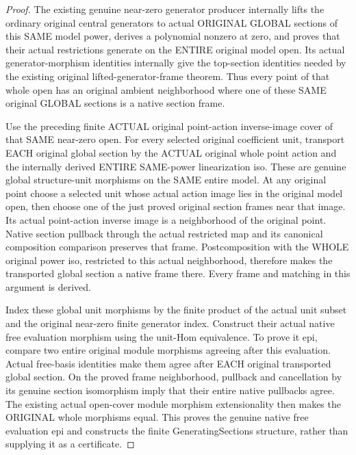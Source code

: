 \begin{proof}
The existing genuine near-zero generator producer internally lifts the
ordinary original central generators to actual ORIGINAL GLOBAL sections of
this SAME model power, derives a polynomial nonzero at zero, and proves
that their actual restrictions generate on the ENTIRE original model open.
Its actual generator-morphism identities internally give the top-section
identities needed by the existing original lifted-generator-frame theorem.
Thus every point of that whole open has an original ambient neighborhood
where one of these SAME original GLOBAL sections is a native section frame.

Use the preceding finite ACTUAL original point-action inverse-image cover
of that SAME near-zero open. For every selected original coefficient unit,
transport EACH original global section by the ACTUAL original whole point
action and the internally derived ENTIRE SAME-power linearization iso.
These are genuine global structure-unit morphisms on the SAME entire model.
At any original point choose a selected unit whose actual action image lies
in the original model open, then choose one of the just proved original
section frames near that image. Its actual point-action inverse image is a
neighborhood of the original point. Native section pullback through the
actual restricted map and its canonical composition comparison preserves
that frame. Postcomposition with the WHOLE original power iso, restricted
to this actual neighborhood, therefore makes the transported global section
a native frame there. Every frame and matching in this argument is derived.

Index these global unit morphisms by the finite product of the actual unit
subset and the original near-zero finite generator index. Construct their
actual native free evaluation morphism using the unit-Hom equivalence.
To prove it epi, compare two entire original module morphisms agreeing after
this evaluation. Actual free-basis identities make them agree after EACH
original transported global section. On the proved frame neighborhood,
pullback and cancellation by its genuine section isomorphism imply that
their entire native pullbacks agree. The existing actual open-cover module
morphism extensionality then makes the ORIGINAL whole morphisms equal.
This proves the genuine native free evaluation epi and constructs the finite
GeneratingSections structure, rather than supplying it as a certificate.
\end{proof}
